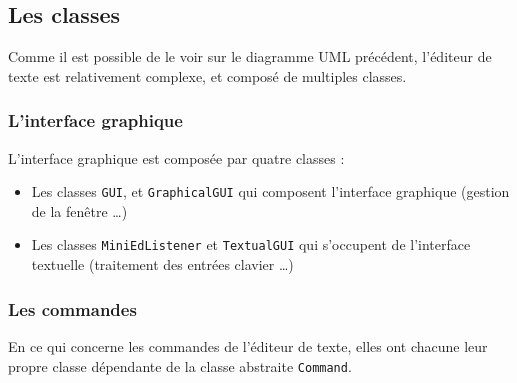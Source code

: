 \documentclass[a4paper]{article}
\begin{document}
	\vspace{0.5cm}

		\subsection{Les classes}

		\vspace{0.5cm}

		Comme il est possible de le voir sur le diagramme UML précédent, l'éditeur de texte est relativement complexe, et composé de multiples classes. 

		\vspace{0.5cm}

			\subsubsection{L'interface graphique}

			L'interface graphique est composée par quatre classes :

			\begin{itemize}
				\item Les classes \texttt{GUI}, et \texttt{GraphicalGUI} qui composent l'interface graphique (gestion de la fenêtre \dots)

				\item Les classes \texttt{MiniEdListener} et \texttt{TextualGUI} qui s'occupent de l'interface textuelle (traitement des entrées clavier \dots)
			\end{itemize}

			\subsubsection{Les commandes}

			En ce qui concerne les commandes de l'éditeur de texte, elles ont chacune leur propre classe dépendante de la classe abstraite \texttt{Command}.
\end{document}
